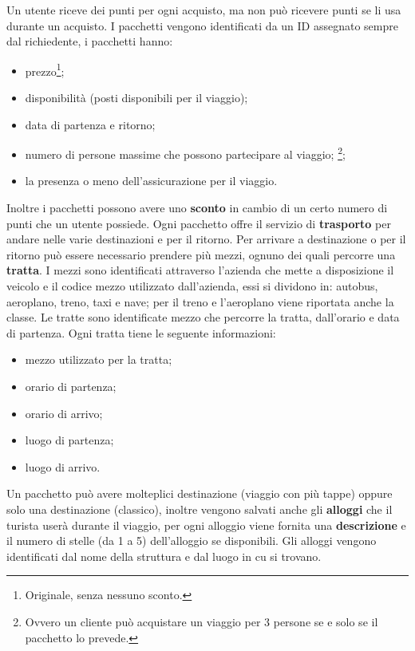  Un utente riceve dei punti per ogni acquisto, ma non può ricevere punti se li usa durante un acquisto.
%
%
I pacchetti vengono identificati da un ID assegnato sempre dal richiedente, i pacchetti hanno:
\begin{multicols}{2}
    \begin{itemize}
        \item prezzo\footnote{Originale, senza nessuno sconto.};
        \item disponibilità (posti disponibili per il viaggio);
        \item data di partenza e ritorno;
        \item numero di persone massime che possono partecipare al viaggio;%
        \footnote{Ovvero un cliente può acquistare un viaggio per 3 persone se e solo se il pacchetto lo prevede.};
        \item la presenza o meno dell'assicurazione per il viaggio.
    \end{itemize}
 \end{multicols}
Inoltre i pacchetti possono avere uno \textbf{sconto} in cambio di un certo numero di punti che un utente possiede.
%
%
Ogni pacchetto offre il servizio di \textbf{trasporto} per andare nelle varie destinazioni e per il ritorno. Per arrivare a destinazione o per il ritorno può essere necessario prendere più mezzi, ognuno dei quali percorre una \textbf{tratta}. I mezzi sono identificati attraverso l'azienda che mette a disposizione il veicolo e il codice mezzo utilizzato dall'azienda, essi si dividono in: autobus, aeroplano, treno, taxi e nave; per il treno e l'aeroplano viene riportata anche la classe. Le tratte sono identificate mezzo che percorre la tratta, dall'orario e data di partenza. Ogni tratta tiene le seguente informazioni:
\begin{multicols}{2}
    \begin{itemize}
        \item mezzo utilizzato per la tratta;
        \item orario di partenza;
        \item orario di arrivo;
        \item luogo di partenza;
        \item luogo di arrivo.
    \end{itemize}
\end{multicols}
%
%
Un pacchetto può avere molteplici destinazione (viaggio con più tappe) oppure solo una destinazione (classico), inoltre vengono salvati anche gli \textbf{alloggi} che il turista userà durante il viaggio, per ogni alloggio viene fornita una \textbf{descrizione} e il numero di stelle (da 1 a 5) dell'alloggio se disponibili. Gli alloggi vengono identificati dal nome della struttura e dal luogo in cu si trovano.
